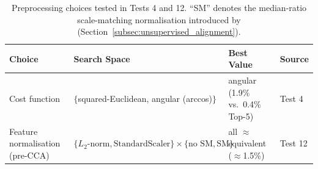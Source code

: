 \begin{table}[H]
\centering
\small
{}
\caption{Method-specific hyperparameters and their search spaces for the
semi-supervised and sliced GW variants (FGW, SS-RISGW, SGW, RISGW),
including the large-scale 288-configuration grid search.}
\label{tab:app_search_methods}
\end{table}

\begin{table}[H]
\centering
\small
\begin{tabularx}{\textwidth}{Xp{4.0cm}Xl}
\toprule
\textbf{Choice} & \textbf{Search Space} & \textbf{Best Value} & \textbf{Source} \\
\midrule
Cost function & $\{$squared-Euclidean, angular (arccos)$\}$ & angular (1.9\% vs.\ 0.4\% Top-5) & Test 4 \\
Feature normalisation (pre-CCA) & $\{L_2\text{-norm}, \text{StandardScaler}\} \times \{\text{no SM}, \text{SM}\}$ & all $\approx$ equivalent ($\approx$1.5\%) & Test 12 \\
\bottomrule
\end{tabularx}
\caption{Preprocessing choices tested in Tests 4 and 12. ``SM'' denotes
the median-ratio scale-matching normalisation introduced by
\textcite{li2026scale} (Section~\ref{subsec:unsupervised_alignment}).}
\label{tab:app_search_preprocessing}
\end{table}

